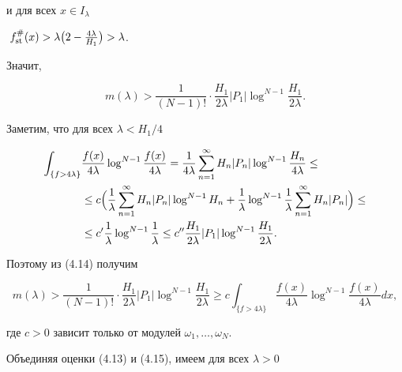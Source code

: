 \begin{pf}
и для всех $x\in I_\lambda\;$ 


$\;f_{\operatorname{st}}^\#(x)>\lambda\bigl(2-\frac{4\lambda}{H_1}\bigr)>\lambda$. 


Значит, 


\begin{equation} 


m(\lambda)>\frac{1}{(N-1)!}\cdot\frac{H_1}{2\lambda}|P_1| 


\log^{N-1}\frac{H_1}{2\lambda}. 


\end{equation} 


Заметим, что для всех $\lambda<H_1/4$ 


\begin{align*} 


\int_{\{f>4\lambda\}} &\frac{f(x)}{4\lambda}\log^{N-1} 


\frac{f(x)}{4\lambda}=\frac{1}{4\lambda}\sum^\infty_{n=1} 


H_n|P_n|\log^{N-1}\frac{H_n}{4\lambda}\le \\ 


% 


& \le c\Bigl(\frac{1}{\lambda}\sum^\infty_{n=1}H_n|P_n|\log^{N-1}H_n 


+\frac{1}{\lambda}\log^{N-1}\frac{1}{\lambda}\sum^\infty_{n=1} 


H_n|P_n|\Bigr) \le \\


% 


& \le c'\frac{1}{\lambda}\log^{N-1}\frac{1}{\lambda}\le 


c''\frac{H_1}{2\lambda}|P_1|\log^{N-1}\frac{H_1}{2\lambda}. 


\end{align*} 


Поэтому из (4.14) получим 


\begin{equation} 


m(\lambda)>\frac{1}{(N-1)!}\cdot\frac{H_1}{2\lambda}|P_1| 


\log^{N-1}\frac{H_1}{2\lambda} \ge 


c\int_{\{f>4\lambda\}}\frac{f(x)}{4\lambda}\log^{N-1} 


\frac{f(x)}{4\lambda}dx, 


\end{equation} 


где $c>0$ зависит только от модулей $\omega_1,\dotsc,\omega_N$. 


Объединяя оценки (4.13) и (4.15), имеем для всех $\lambda>0$ 



\end{pf}

